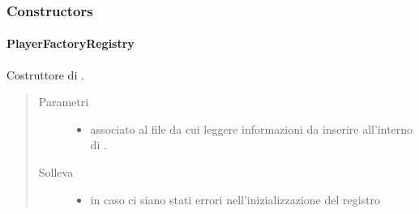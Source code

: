 \documentclass[letterpaper,10pt,italian]{sphinxmanual}
\begin{document}
\subsubsection{Constructors}
\label{\detokenize{source/it/unicam/cs/pa/mastermind/players/PlayerFactoryRegistry:constructors}}

\paragraph{PlayerFactoryRegistry}
\label{\detokenize{source/it/unicam/cs/pa/mastermind/players/PlayerFactoryRegistry:id1}}

\begin{fulllineitems}
\label{\detokenize{source/it/unicam/cs/pa/mastermind/players/PlayerFactoryRegistry:it.unicam.cs.pa.mastermind.players.PlayerFactoryRegistry.PlayerFactoryRegistry(String)}}
Costruttore di .
\begin{quote}\begin{description}
\item[{Parametri}] \leavevmode\begin{itemize}
\item {} 
 \textendash{} associato al file da cui leggere informazioni da inserire all’interno di .

\end{itemize}

\item[{Solleva}] \leavevmode\begin{itemize}
\item {} 
 \textendash{} in caso ci siano stati errori nell’inizializzazione del registro

\end{itemize}

\end{description}\end{quote}

\end{fulllineitems}
\end{document}
